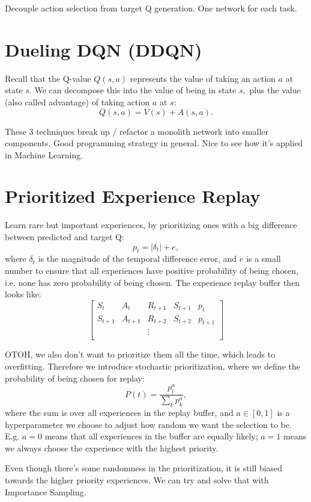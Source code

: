 \documentclass[20pt]{extarticle}
\theoremstyle{plain}
\theoremstyle{definition}
\theoremstyle{remark}
\newcommand{\0}{\varnothing}
\newcommand{\<}{\langle}
\renewcommand{\>}{\rangle}
\begin{document}
Decouple action selection from target Q generation. One network for each task.

\section{Dueling DQN (DDQN)}

Recall that the Q-value $ Q(s, a) $ represents the value of taking an action $ a
$ at state $ s. $ We can decompose this into the value of being in state $ s, $
plus the value (also called advantage) of taking action $ a $ at $ s: $ $$
  Q(s, a) = V(s) + A(s, a).
$$

These 3 techniques break up / refactor a monolith network into smaller components. Good programming strategy in general. Nice to see how it's applied in Machine Learning.

\section{Prioritized Experience Replay}

Learn rare but important experiences, by prioritizing ones with a big difference between predicted and target Q: $$
p _ { t } = \left| \delta _ { t } \right| + e,
$$
where $ \delta_t $ is the magnitude of the temporal difference error, and $ e $ is a small number to ensure that all experiences have positive probability of being chosen, i.e. none has zero probability of being chosen. The experience replay buffer then looks like: $$
\begin{bmatrix}
S_t & A_t & R_{t+1} & S_{t+1} & p_t \\
S_{t+1} & A_{t+1} & R_{t+2} & S_{t+2} & p_{t+1} \\
& & \vdots & & \\
\end{bmatrix}
$$

OTOH, we also don't want to prioritize them all the time, which leads to overfitting. Therefore we introduce stochastic prioritization, where we define the probability of being chosen for replay: $$
P(t) = \frac{p_t^a}{\sum_k p_k^a},
$$
where the sum is over all experiences in the replay buffer, and $ a \in [0, 1] $ is a hyperparameter we choose to adjust how random we want the selection to be. E.g. $ a = 0 $ means that all experiences in the buffer are equally likely; $ a = 1 $ means we always choose the experience with the highest priority.

Even though there's some randomness in the prioritization, it is still biased towards the higher priority experiences. We can try and solve that with Importance Sampling.
\end{document}
